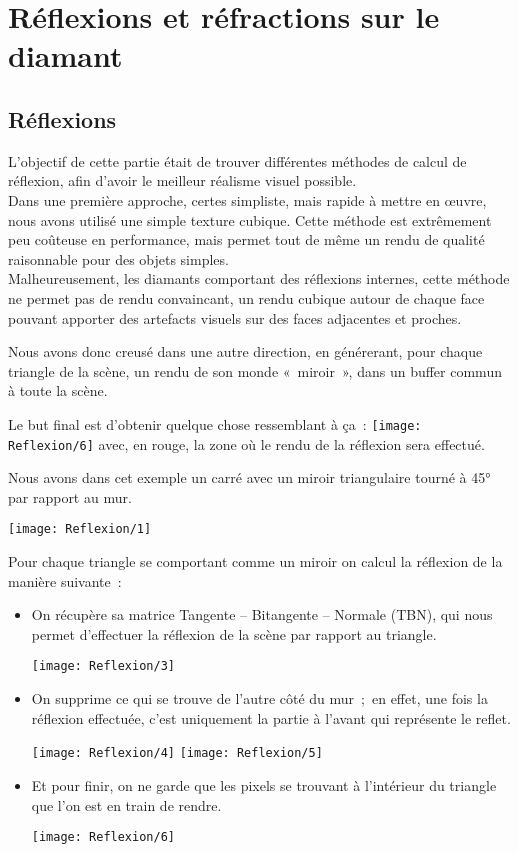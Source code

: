 \section{Réflexions et réfractions sur le diamant}

\subsection{Réflexions}

L'objectif de cette partie était de trouver  différentes méthodes
de calcul de réflexion, afin d'avoir le meilleur réalisme visuel possible. \\

Dans une première approche, certes simpliste, mais rapide à mettre en œuvre,
nous avons utilisé une simple texture cubique. Cette méthode est extrêmement peu
coûteuse en performance, mais permet tout de même un rendu de qualité raisonnable
pour des objets simples. \\
Malheureusement, les diamants comportant des réflexions internes, cette méthode ne permet pas
de rendu convaincant, un rendu cubique autour de chaque face pouvant apporter des artefacts
visuels sur des faces adjacentes et proches.

Nous avons donc creusé dans une autre direction, en générerant, pour chaque triangle de la scène,
un rendu de son monde «~miroir~», dans un buffer commun à toute la scène.

Le but final est d'obtenir quelque chose ressemblant à ça~:
\texttt{[image: Reflexion/6]}
avec, en rouge, la zone où le rendu de la réflexion sera effectué.

Nous avons dans cet exemple un carré avec un miroir triangulaire tourné à 45° par rapport au mur.

\texttt{[image: Reflexion/1]}

Pour chaque triangle se comportant comme un miroir on calcul la réflexion de la manière suivante~:

\begin{itemize}
    \item On récupère sa matrice Tangente – Bitangente – Normale (TBN), qui nous permet
        d'effectuer la réflexion de la scène par rapport au triangle.

        \texttt{[image: Reflexion/3]}

    \item On supprime ce qui se trouve de l'autre côté du mur ; en effet, une
        fois la réflexion effectuée, c'est uniquement la partie à l'avant qui
        représente le reflet.

        \texttt{[image: Reflexion/4]}
        \texttt{[image: Reflexion/5]}
    \item Et pour finir, on ne garde que les pixels se trouvant à l'intérieur
        du triangle que l'on est en train de rendre.

        \texttt{[image: Reflexion/6]}
\end{itemize}

